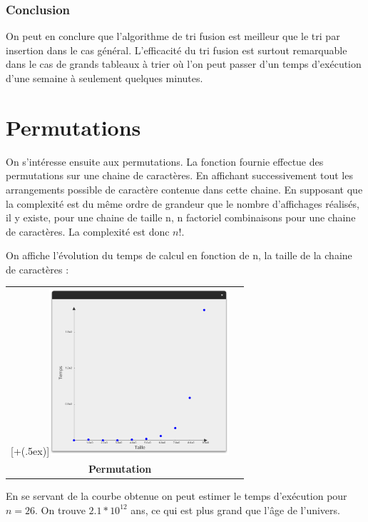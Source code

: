 \documentclass[12pt]{article}
\newcommand*{\addheight}[2][.5ex]{%
  \raisebox{0pt}[\dimexpr\height+(#1)\relax]{#2}%
}
\begin{document}
\subsubsection*{Conclusion}

On peut en conclure que l'algorithme de tri fusion est meilleur que le tri par insertion dans le cas général. L'efficacité du tri fusion est surtout remarquable dans le cas de grands tableaux à trier où l'on peut passer d'un temps d'exécution d'une semaine à seulement quelques minutes.


\section{Permutations}

On s'intéresse ensuite aux permutations.
La fonction fournie effectue des permutations sur une chaine de caractères. En affichant successivement tout les arrangements possible de caractère contenue dans cette chaine.
En supposant que la complexité est du même ordre de grandeur que le nombre d'affichages réalisés, il y existe, pour une chaine de taille n, n factoriel combinaisons pour une chaine de caractères. La complexité est donc $n!$.


On affiche l'évolution du temps de calcul en fonction de n, la taille de la chaine de caractères :

\begin{tabular}[H]{c c}
    \addheight{\includegraphics[width=18em]{permu.png}}  & \\
    \small \textbf{Permutation} & \\
\end{tabular}

En se servant de la courbe obtenue on peut estimer le temps d'exécution pour $n=26$. On trouve $2.1*10^{12}$ ans, ce qui est plus grand que l'âge de l'univers.
\end{document}
